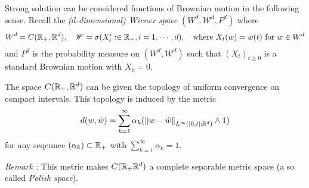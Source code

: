 \documentclass[10pt,a4paper]{article}
\begin{document}
Strong solution can be considered functions of Brownian motion in the following sense. Recall the \emph{($d$-dimensional) Wiener space} $(W^d, \mathscr{W}^d, P^d)$ where
\begin{align*}
W^d = C(\mathbb{R}_+, \mathbb{R}^d), \quad \mathscr{W} = \sigma(X_t^i : \in \mathbb{R}_+, i=1, \cdots, d), \quad \text{where }X_t(w) = w(t) \text{ for } w\in W^d
\end{align*}
and $P^d$ is the probability measure on $(W^d, \mathscr{W}^d)$ such that $(X_t)_{t\geq 0}$ is a standard Brownian motion with $X_0 =0$.

\quad The space $C(\mathbb{R}_+, \mathbb{R}^d)$ can be given the topology of uniform convergence on compact intervals. This topology is induced by the metric
\begin{align*}
d(w, \tilde{w}) = \sum_{k=1}^{\infty} \alpha_k (\snorms{w - \tilde{w}}{L^{\infty}([0, t];\reals^d)} \wedge 1)
\end{align*}
for any seqeunce $(\alpha_k) \subset \mathbb{R}_+$ with $\sum_{k=1}^{\infty} \alpha_k =1$. 
\s

\emph{Remark :} This metric makes $C(\mathbb{R}_+ \mathbb{R}^d)$ a complete separable metric space (a so called \emph{Polish space}).
\s
\end{document}
